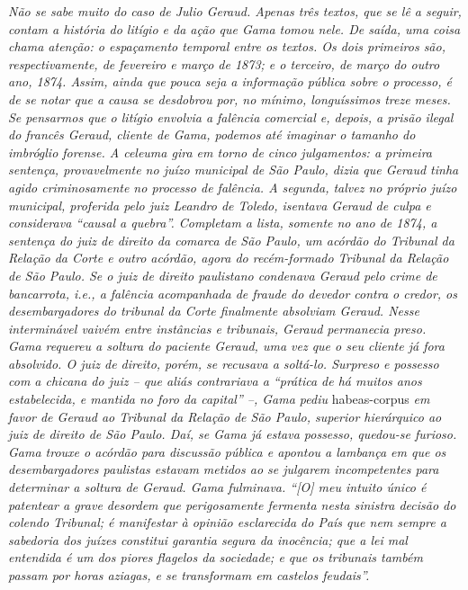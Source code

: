 \begin{argumento}
\emph{Não se sabe muito do caso de Julio Geraud. Apenas três textos, que
se lê a seguir, contam a história do litígio e da ação que Gama tomou
nele. De saída, uma coisa chama atenção: o espaçamento temporal entre os
textos. Os dois primeiros são, respectivamente, de fevereiro e março de
1873; e o terceiro, de março do outro ano, 1874. Assim, ainda que pouca
seja a informação pública sobre o processo, é de se notar que a causa se
desdobrou por, no mínimo, longuíssimos treze meses. Se pensarmos que o
litígio envolvia a falência comercial e, depois, a prisão ilegal do
francês Geraud, cliente de Gama, podemos até imaginar o tamanho do
imbróglio forense. A celeuma gira em torno de cinco julgamentos: a
primeira sentença, provavelmente no juízo municipal de São Paulo, dizia
que Geraud tinha agido criminosamente no processo de falência. A
segunda, talvez no próprio juízo municipal, proferida pelo juiz Leandro
de Toledo, isentava Geraud de culpa e considerava ``causal a quebra''.
Completam a lista, somente no ano de 1874, a sentença do juiz de direito
da comarca de São Paulo, um acórdão do Tribunal da Relação da Corte e
outro acórdão, agora do recém-formado Tribunal da Relação de São Paulo.
Se o juiz de direito paulistano condenava Geraud pelo crime de
bancarrota, i.e., a falência acompanhada de fraude do devedor contra o
credor, os desembargadores do tribunal da Corte finalmente absolviam
Geraud. Nesse interminável vaivém entre instâncias e tribunais, Geraud
permanecia preso. Gama requereu a soltura do paciente Geraud, uma vez
que o seu cliente já fora absolvido. O juiz de direito, porém, se
recusava a soltá-lo. Surpreso e possesso com a chicana do juiz -- que
aliás contrariava a ``prática de há muitos anos estabelecida, e mantida
no foro da capital'' --, Gama pediu} habeas-corpus \emph{em favor de
Geraud ao Tribunal da Relação de São Paulo, superior hierárquico ao juiz
de direito de São Paulo. Daí, se Gama já estava possesso, quedou-se
furioso. Gama trouxe o acórdão para discussão pública e apontou a
lambança em que os desembargadores paulistas estavam metidos ao se
julgarem incompetentes para determinar a soltura de Geraud. Gama
fulminava. ``{[}O{]} meu intuito único é patentear a grave desordem que
perigosamente fermenta nesta sinistra decisão do colendo Tribunal; é
manifestar à opinião esclarecida do País que nem sempre a sabedoria dos
juízes constitui garantia segura da inocência; que a lei mal entendida é
um dos piores flagelos da sociedade; e que os tribunais também passam
por horas aziagas, e se transformam em castelos feudais''.}
\end{argumento}

